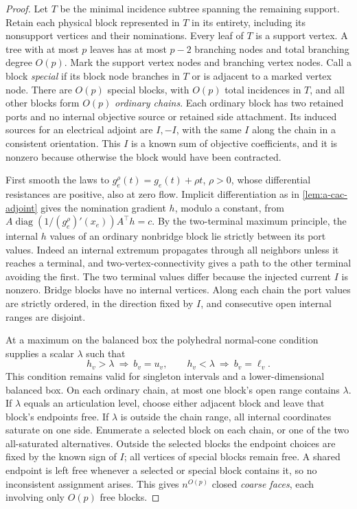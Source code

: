 \begin{proof}
Let $T$ be the minimal incidence subtree spanning the remaining support.
Retain each physical block represented in $T$ in its entirety, including
its nonsupport vertices and their nominations. Every leaf of $T$ is a
support vertex. A tree with at most $p$ leaves has at most $p-2$ branching
nodes and total branching degree $O(p)$. Mark the support vertex nodes
and branching vertex nodes. Call a block \emph{special} if its block node
branches in $T$ or is adjacent to a marked vertex node. There are $O(p)$
special blocks, with $O(p)$ total incidences in $T$, and all other blocks
form $O(p)$ \emph{ordinary chains}. Each ordinary block has two retained
ports and no internal objective source or retained side attachment. Its
induced sources for an electrical adjoint are $I,-I$, with the same $I$
along the chain in a consistent orientation. This $I$ is a known sum of
objective coefficients, and it is nonzero because otherwise the block
would have been contracted.

First smooth the laws to $g_e^\rho(t)=g_e(t)+\rho t$, $\rho>0$, whose
differential resistances are positive, also at zero flow.
Implicit differentiation as in \cref{lem:a-cac-adjoint} gives the
nomination gradient $h$, modulo a constant, from
$A\operatorname{diag}(1/(g_e^\rho)'(x_e))A^\top h=c$.
By the two-terminal maximum principle, the internal $h$ values of an
ordinary nonbridge block lie strictly between its port values. Indeed an
internal extremum propagates through all neighbors unless it reaches a
terminal, and two-vertex-connectivity gives a path to the other terminal
avoiding the first. The two terminal values differ because the injected
current $I$ is nonzero. Bridge blocks have no internal vertices.
Along each chain the port values are strictly ordered, in the direction
fixed by $I$, and consecutive open internal ranges are disjoint.

At a maximum on the balanced box the polyhedral normal-cone condition
supplies a scalar $\lambda$ such that
\begin{equation}
 h_v>\lambda\ \Longrightarrow\ b_v=u_v,
 \qquad h_v<\lambda\ \Longrightarrow\ b_v=\ell_v.
 \label{eq:a-wcac-kkt}
\end{equation}
This condition remains valid for singleton intervals and a
lower-dimensional balanced box. On each ordinary chain, at most one
block's open range contains $\lambda$. If $\lambda$ equals an articulation
level, choose either adjacent block and leave that block's endpoints free.
If $\lambda$ is outside the chain range, all internal coordinates saturate
on one side. Enumerate a selected block on each chain, or one of the two
all-saturated alternatives. Outside the selected blocks the endpoint
choices are fixed by the known sign of $I$; all vertices of special blocks
remain free. A shared endpoint is left free whenever a selected or special
block contains it, so no inconsistent assignment arises. This gives
$n^{O(p)}$ closed \emph{coarse faces}, each involving only $O(p)$ free
blocks.


\end{proof}

